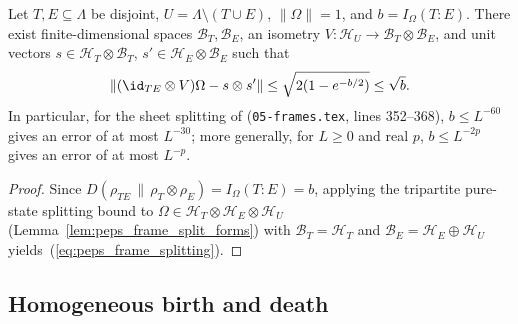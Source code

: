 \begin{lemma}
    \label{lem:peps_frame_splitting}
    \leanok
    Let $T,E\subseteq\Lambda$ be disjoint, $U=\Lambda\setminus(T\cup E)$,
    $\lVert\Omega\rVert=1$, and $b=I_\Omega(T:E)$. There exist
    finite-dimensional spaces $\mathcal B_T,\mathcal B_E$, an isometry
    $V\colon\mathcal H_U\to\mathcal B_T\otimes\mathcal B_E$, and unit vectors
    $s\in\mathcal H_T\otimes\mathcal B_T$, $s'\in\mathcal H_E\otimes\mathcal B_E$
    such that
    \begin{align}
        \lVert(\id_{TE}\otimes V)\Omega-s\otimes s'\rVert
        \le\sqrt{2(1-e^{-b/2})}\le\sqrt b .
        \label{eq:peps_frame_splitting}
    \end{align}
    In particular, for the sheet splitting of
    \cite[Lemma~6.4]{OpenAI2026PolynomialPEPS} (\texttt{05-frames.tex},
    lines 352--368), $b\le L^{-60}$ gives an error of at most $L^{-30}$; more
    generally, for $L\ge0$ and real $p$, $b\le L^{-2p}$ gives an error of at
    most $L^{-p}$.
\end{lemma}

\begin{proof}\leanok
    Since $D(\rho_{TE}\,\|\,\rho_T\otimes\rho_E)=I_\Omega(T:E)=b$, applying the
    tripartite pure-state splitting bound to $\Omega\in\mathcal H_T\otimes\mathcal H_E\otimes\mathcal H_U$
    (Lemma~\ref{lem:peps_frame_split_forms}) with $\mathcal B_T=\mathcal H_T$
    and $\mathcal B_E=\mathcal H_E\oplus\mathcal H_U$ yields~(\ref{eq:peps_frame_splitting}).
\end{proof}

\subsection{Homogeneous birth and death}

